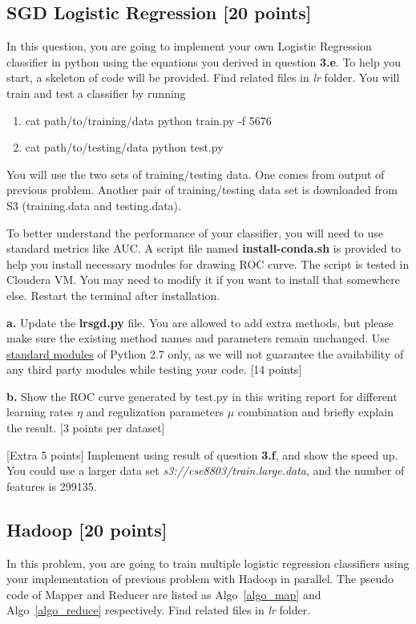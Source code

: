 \documentclass[12pt]{article}
\begin{document}
\subsection{SGD Logistic Regression [20 points]}
In this question, you are going to implement your own Logistic Regression classifier in python using the equations you derived in question \textbf{3.e}. To help you start, a skeleton of code will be provided. Find related files in \textit{lr} folder. You will train and test a classifier by running
\begin{enumerate}
\item cat path/to/training/data \textbar{} python train.py -f 5676
\item cat path/to/testing/data \textbar{} python test.py 
\end{enumerate}
You will use the two sets of training/testing data. One comes from output of previous problem. Another pair of training/testing data set is downloaded from S3 (training.data and testing.data).

To better understand the performance of your classifier, you will need to use standard metrics like AUC. A script file named \textbf{install-conda.sh} is provided to help you install necessary modules for drawing ROC curve. The script is tested in Cloudera VM. You may need to modify it if you want to install that somewhere else. Restart the terminal after installation.

\textbf{a.} Update the \textbf{lrsgd.py} file. You are allowed to add extra methods, but please make sure the existing method names and parameters remain unchanged. Use \href{https://docs.python.org/2/library/}{standard modules} of Python 2.7 only, as we will not guarantee the availability of any third party modules while testing your code. [14 points]

\textbf{b.} Show the ROC curve generated by test.py in this writing report for different learning rates $\eta$ and regulization parameters $\mu$ combination and briefly explain the result. [3 points per dataset]

[Extra 5 points] Implement using result of question \textbf{3.f}, and show the speed up. You could use a larger data set \textit{s3://cse8803/train.large.data}, and the number of features is 299135.

\subsection{Hadoop [20 points]}
In this problem, you are going to train multiple logistic regression classifiers using your implementation of previous problem with Hadoop in parallel. The pseudo code of Mapper and Reducer are listed as Algo~\ref{algo_map} and Algo~\ref{algo_reduce} respectively. Find related files in \textit{lr} folder.
\end{document}
